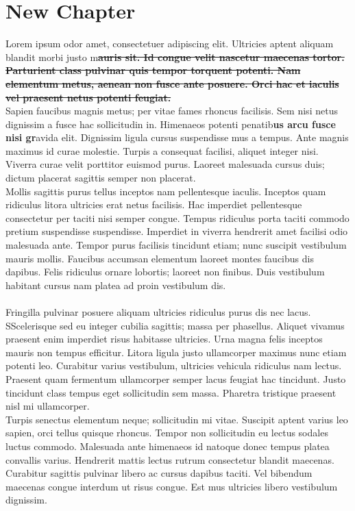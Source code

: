 \documentclass{article}
\begin{document}
\section{New Chapter}
Lorem ipsum odor amet, consectetuer adipiscing elit. Ultricies aptent aliquam blandit morbi justo m\textbf{\sout{auris sit. Id congue velit nascetur maecenas tortor. Parturient class pulvinar quis tempor torquent potenti. Nam elementum metus, aenean non fusce ante posuere. Orci hac et iaculis vel praesent netus potenti feugiat.}}\\Sapien faucibus magnis metus; per vitae fames rhoncus facilisis. Sem nisi netus dignissim a fusce hac sollicitudin in. Himenaeos potenti penatib\textbf{us arcu fusce nisi gr}avida elit. Dignissim ligula cursus suspendisse mus a tempus. Ante magnis maximus id curae molestie. Turpis a consequat facilisi, aliquet integer nisi. Viverra curae velit porttitor euismod purus. Laoreet malesuada cursus duis; dictum placerat sagittis semper non placerat.\\Mollis sagittis purus tellus inceptos nam pellentesque iaculis. Inceptos quam ridiculus litora ultricies erat netus facilisis. Hac imperdiet pellentesque consectetur per taciti nisi semper congue. Tempus ridiculus porta taciti commodo pretium suspendisse suspendisse. Imperdiet in viverra hendrerit amet facilisi odio malesuada ante. Tempor purus facilisis tincidunt etiam; nunc suscipit vestibulum mauris mollis. Faucibus accumsan elementum laoreet montes faucibus dis dapibus. Felis ridiculus ornare lobortis; laoreet non finibus. Duis vestibulum habitant cursus nam platea ad proin vestibulum dis.\\\\Fringilla pulvinar posuere aliquam ultricies ridiculus purus dis nec lacus. SScelerisque sed eu integer cubilia sagittis; massa per phasellus. Aliquet vivamus praesent enim imperdiet risus habitasse ultricies. Urna magna felis inceptos mauris non tempus efficitur. Litora ligula justo ullamcorper maximus nunc etiam potenti leo. Curabitur varius vestibulum, ultricies vehicula ridiculus nam lectus. Praesent quam fermentum ullamcorper semper lacus feugiat hac tincidunt. Justo tincidunt class tempus eget sollicitudin sem massa. Pharetra tristique praesent nisl mi ullamcorper.\\Turpis senectus elementum neque; sollicitudin mi vitae. Suscipit aptent varius leo sapien, orci tellus quisque rhoncus. Tempor non sollicitudin eu lectus sodales luctus commodo. Malesuada ante himenaeos id natoque donec tempus platea convallis varius. Hendrerit mattis lectus rutrum consectetur blandit maecenas. Curabitur sagittis pulvinar libero ac cursus dapibus taciti. Vel bibendum maecenas congue interdum ut risus congue. Est mus ultricies libero vestibulum dignissim.\\
\end{document}
